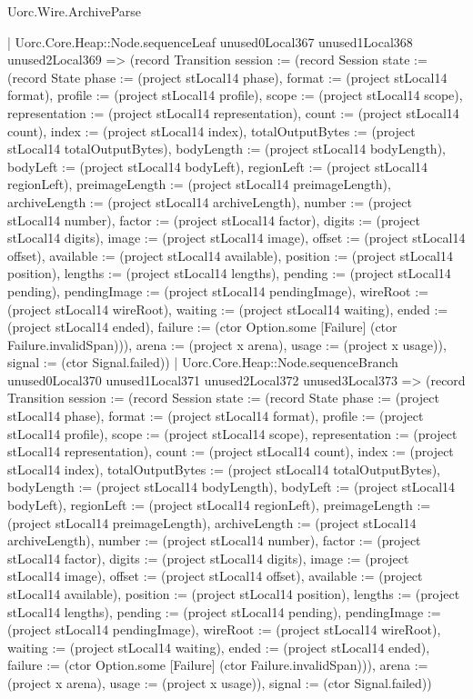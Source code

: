 \begin{lexlean}{Uorc.Wire.ArchiveParse}
\begin{semanticmodule}
{            | Uorc.Core.Heap::Node.sequenceLeaf unused0Local367 unused1Local368 unused2Local369 => (record Transition {session := (record Session {state := (record State {phase := (project stLocal14 phase), format := (project stLocal14 format), profile := (project stLocal14 profile), scope := (project stLocal14 scope), representation := (project stLocal14 representation), count := (project stLocal14 count), index := (project stLocal14 index), totalOutputBytes := (project stLocal14 totalOutputBytes), bodyLength := (project stLocal14 bodyLength), bodyLeft := (project stLocal14 bodyLeft), regionLeft := (project stLocal14 regionLeft), preimageLength := (project stLocal14 preimageLength), archiveLength := (project stLocal14 archiveLength), number := (project stLocal14 number), factor := (project stLocal14 factor), digits := (project stLocal14 digits), image := (project stLocal14 image), offset := (project stLocal14 offset), available := (project stLocal14 available), position := (project stLocal14 position), lengths := (project stLocal14 lengths), pending := (project stLocal14 pending), pendingImage := (project stLocal14 pendingImage), wireRoot := (project stLocal14 wireRoot), waiting := (project stLocal14 waiting), ended := (project stLocal14 ended), failure := (ctor Option.some [Failure] (ctor Failure.invalidSpan))}), arena := (project x arena), usage := (project x usage)}), signal := (ctor Signal.failed)})
            | Uorc.Core.Heap::Node.sequenceBranch unused0Local370 unused1Local371 unused2Local372 unused3Local373 => (record Transition {session := (record Session {state := (record State {phase := (project stLocal14 phase), format := (project stLocal14 format), profile := (project stLocal14 profile), scope := (project stLocal14 scope), representation := (project stLocal14 representation), count := (project stLocal14 count), index := (project stLocal14 index), totalOutputBytes := (project stLocal14 totalOutputBytes), bodyLength := (project stLocal14 bodyLength), bodyLeft := (project stLocal14 bodyLeft), regionLeft := (project stLocal14 regionLeft), preimageLength := (project stLocal14 preimageLength), archiveLength := (project stLocal14 archiveLength), number := (project stLocal14 number), factor := (project stLocal14 factor), digits := (project stLocal14 digits), image := (project stLocal14 image), offset := (project stLocal14 offset), available := (project stLocal14 available), position := (project stLocal14 position), lengths := (project stLocal14 lengths), pending := (project stLocal14 pending), pendingImage := (project stLocal14 pendingImage), wireRoot := (project stLocal14 wireRoot), waiting := (project stLocal14 waiting), ended := (project stLocal14 ended), failure := (ctor Option.some [Failure] (ctor Failure.invalidSpan))}), arena := (project x arena), usage := (project x usage)}), signal := (ctor Signal.failed)})
}
\end{semanticmodule}
\end{lexlean}
